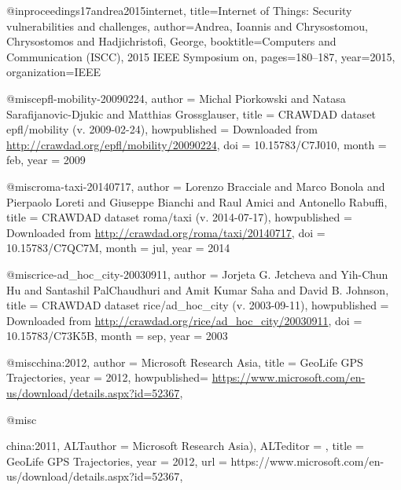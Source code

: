 {{{{@inproceedings{17andrea2015internet,
	title={Internet of Things: Security vulnerabilities and challenges},
	author={Andrea, Ioannis and Chrysostomou, Chrysostomos and Hadjichristofi, George},
	booktitle={Computers and Communication (ISCC), 2015 IEEE Symposium on},
	pages={180--187},
	year={2015},
	organization={IEEE}
}
































@misc{epfl-mobility-20090224,
	author = {Michal Piorkowski and Natasa Sarafijanovic-Djukic and Matthias Grossglauser},
	title = {{CRAWDAD} dataset epfl/mobility (v. 2009-02-24)},
	howpublished = {Downloaded from \url{http://crawdad.org/epfl/mobility/20090224}},
	doi = {10.15783/C7J010},
	month = feb,
	year = 2009
}

@misc{roma-taxi-20140717,
	author = {Lorenzo Bracciale and Marco Bonola and Pierpaolo Loreti and Giuseppe Bianchi and Raul Amici and Antonello Rabuffi},
	title = {{CRAWDAD} dataset roma/taxi (v. 2014-07-17)},
	howpublished = {Downloaded from \url{http://crawdad.org/roma/taxi/20140717}},
	doi = {10.15783/C7QC7M},
	month = jul,
	year = 2014
}

@misc{rice-ad_hoc_city-20030911,
	author = {Jorjeta G. Jetcheva and Yih-Chun Hu and Santashil PalChaudhuri and Amit Kumar Saha and David B. Johnson},
	title = {{CRAWDAD} dataset rice/ad\_hoc\_city (v. 2003-09-11)},
	howpublished = {Downloaded from \url{http://crawdad.org/rice/ad_hoc_city/20030911}},
	doi = {10.15783/C73K5B},
	month = sep,
	year = 2003
}

@misc{china:2012,
	author = {Microsoft Research Asia},
	title = {GeoLife GPS Trajectories},
	year = {2012},
	howpublished= {\url{https://www.microsoft.com/en-us/download/details.aspx?id=52367}},
}


@misc{china:2011,
	ALTauthor = {Microsoft Research Asia)},
	ALTeditor = {},
	title = {GeoLife GPS Trajectories,
	year = {2012},
	url = {https://www.microsoft.com/en-us/download/details.aspx?id=52367},
	}
	
}}}}}

